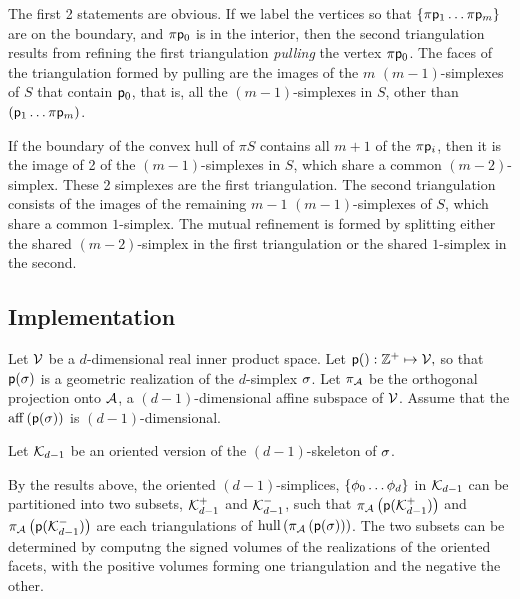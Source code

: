 The first 2 statements are obvious.
If we label the vertices so that $\{\pi \mathsf{p}_1 \ldots  \pi \mathsf{p}_m\}$
are on the boundary, and $\pi \mathsf{p}_0$ is in the interior,
then the second triangulation results from refining the first
triangulation {\it pulling}
\cite{lee-hdcg-17-2004} the vertex $\pi \mathsf{p}_0$.
The faces of the triangulation formed by pulling
are the images of the $m$ $(m-1)$-simplexes
of $S$ that contain $\mathsf{p}_0$, that is, all the $(m-1)$-simplexes in $S$,
other than $(\mathsf{p}_1 \ldots  \pi \mathsf{p}_m)$.

\begin{Theorem}
\label{two-simplex-case}
If the boundary of the convex hull of $\pi S$
contains all $m+1$ of the $\pi \mathsf{p}_i$,
then it is the image of 2 of the $(m-1)$-simplexes in $S$,
which share a common $(m-2)$-simplex.
These 2 simplexes are the first triangulation.
The second triangulation consists of the images
of the remaining $m-1$ $(m-1)$-simplexes of $S$,
which share a common $1$-simplex.
The mutual refinement is formed by splitting either
the shared $(m-2)$-simplex in the first triangulation
or the shared $1$-simplex in the second.
\end{Theorem}

\subsection{Implementation}

Let $\mathcal{V}$ be a $d$-dimensional real inner product space.
Let $\mathsf{p}() : \mathbb{Z}^{+} \mapsto \mathcal{V},$
so that $\mathsf{p}(\sigma)$ is a geometric realization of the $d$-simplex $\sigma$.
Let $\pi_{\mathcal{A}}$ be the orthogonal projection onto
$\mathcal{A}$, a $(d-1)$-dimensional affine subspace of $\mathcal{V}$.
Assume that the $\affine_span \left( \p(\Ssimplex) \right)$
is $(d-1)$-dimensional.

Let $\mathcal{K}_{d-1}$ be an oriented version of the $(d-1)$-skeleton of $\sigma$.

By the results above, the oriented $(d-1)$-simplices,
$\{ \phi_0 \ldots \phi_d \}$ in $\mathcal{K}_{d-1}$
can be partitioned into two subsets, $\mathcal{K}_{d-1}^{+}$
and $\mathcal{K}_{d-1}^{-}$, such that
$\pi_{\mathcal{A}} \left( \mathsf{p} ( \mathcal{K}_{d-1}^{+} ) \right)$
and
$\pi_{\mathcal{A}} \left( \mathsf{p} ( \mathcal{K}_{d-1}^{-} ) \right)$
are each triangulations of
$\convex_span \left( \Projection_{\Aspace} \left( \p ( \Ssimplex ) \right) \right)$.
The two subsets can be determined by computng the signed
volumes of the realizations of the oriented facets,
with the positive volumes forming one triangulation and the negative the other.

